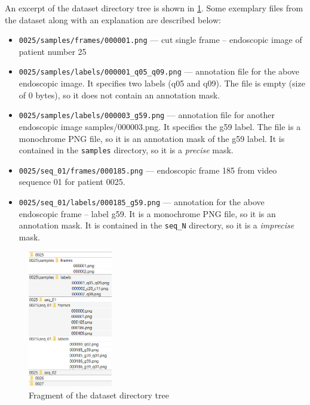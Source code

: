 \documentclass[preprint]{article}
\begin{document}
An excerpt of the dataset directory tree is shown in \cref{fig:tree}. Some exemplary files from the dataset along with an explanation are described below:

\begin{itemize}
    \item \texttt{0025/samples/frames/000001.png} --- cut single frame -- endoscopic image of patient number 25
    \item \texttt{0025/samples/labels/000001\_q05\_q09.png} --- annotation file for the above endoscopic image. It specifies two labels (q05 and q09). The file is empty (size of 0 bytes), so it does not contain an annotation mask.
    \item \texttt{0025/samples/labels/000003\_g59.png} --- annotation file for another endoscopic image {samples/000003.png}. It specifies the g59 label. The file is a monochrome PNG file, so it is an annotation mask of the g59 label. It is contained in the \texttt{samples} directory, so it is a \textit{precise} mask.
    \item \texttt{0025/seq\_01/frames/000185.png} --- endoscopic frame 185 from video sequence 01 for patient 0025. 
    \item \texttt{0025/seq\_01/labels/000185\_g59.png} --- annotation for the above endoscopic frame -- label g59. It is a monochrome PNG file, so it is an annotation mask. It is contained in the \texttt{seq\_N} directory, so it is a \textit{imprecise} mask.
\end{itemize}


\begin{figure}[ht]
\centering
\includegraphics[height=6cm]{tree}
\caption{Fragment of the dataset directory tree}
\label{fig:tree}
\end{figure}


\end{document}
